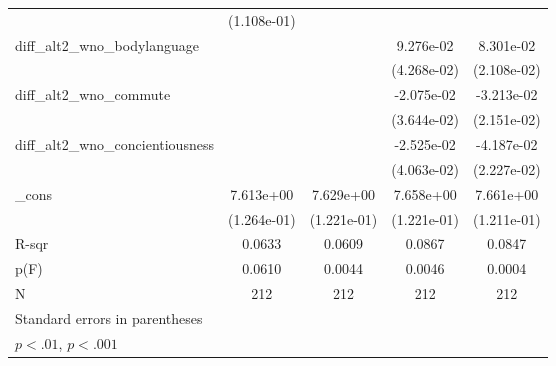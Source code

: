 {\begin{tabular}{l*{4}{c}}
                                      & (1.108e-01)           &                       &                       &                       \\
    \addlinespace
    diff\_alt2\_wno\_bodylanguage     &                       &                       & 9.276e-02             & 8.301e-02\sym{**}     \\
                                      &                       &                       & (4.268e-02)           & (2.108e-02)           \\
    \addlinespace
    diff\_alt2\_wno\_commute          &                       &                       & -2.075e-02            & -3.213e-02            \\
                                      &                       &                       & (3.644e-02)           & (2.151e-02)           \\
    \addlinespace
    diff\_alt2\_wno\_concientiousness &                       &                       & -2.525e-02            & -4.187e-02            \\
                                      &                       &                       & (4.063e-02)           & (2.227e-02)           \\
    \addlinespace
    \_cons                            & 7.613e+00\sym{**}     & 7.629e+00\sym{**}     & 7.658e+00\sym{**}     & 7.661e+00\sym{**}     \\
                                      & (1.264e-01)           & (1.221e-01)           & (1.221e-01)           & (1.211e-01)           \\
    \midrule
    R-sqr                             & 0.0633                & 0.0609                & 0.0867                & 0.0847                \\
    p(F)                              & 0.0610                & 0.0044                & 0.0046                & 0.0004                \\
    N                                 & 212                   & 212                   & 212                   & 212                   \\
    \bottomrule
    \multicolumn{5}{l}{\footnotesize Standard errors in parentheses}                                                                  \\
    \multicolumn{5}{l}{\footnotesize \sym{*} \(p<.01\), \sym{**} \(p<.001\)}                                                          \\
\end{tabular}
}
